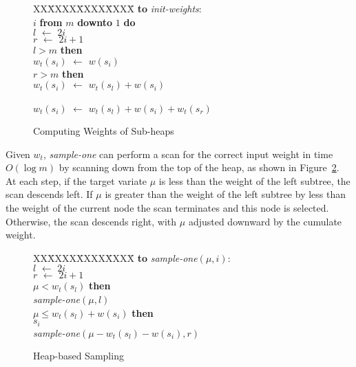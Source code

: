 \documentclass[12pt]{article}
\newcommand{\asgn}{\,\,\leftarrow\,\,}
\begin{document}
  \begin{figure}
    \centering
    \begin{minipage}{0.6\textwidth}
      \begin{tabbing}
      XX\=XXXX\=XXXX\=XXXX\=\kill
      {\bf to} {\it init-weights}: \\
       $i$ {\bf from} $m$ {\bf downto} $1$ {\bf do} \\
      \>\>$l \asgn 2i$ \\
      \>\>$r \asgn 2i + 1$ \\
      \> $l > m$ {\bf then} \\
      \>\>\>$w_t(s_i) \asgn w(s_i)$ \\
      \> $r > m$ {\bf then} \\
      \>\>\>$w_t(s_i) \asgn w_t(s_l) + w(s_i)$ \\
      \>\\
      \>\>\>$w_t(s_i) \asgn w_t(s_l) + w(s_i) + w_t(s_r)$
    \end{tabbing}
    \end{minipage}
    \caption{Computing Weights of Sub-heaps}\label{fig-heap}
  \end{figure}

  Given $w_t$, {\em sample-one} can perform a scan for the
  correct input weight in time $O(\log m)$ by scanning down
  from the top of the heap, as shown in
  Figure~\ref{fig-onlm}.  At each step, if the target
  variate $\mu$ is less than the weight of the left subtree,
  the scan descends left.  If $\mu$ is greater than the
  weight of the left subtree by less than the weight of the
  current node the scan terminates and this node is
  selected.  Otherwise, the scan descends right, with
  $\mu$ adjusted downward by the cumulate weight.

  \begin{figure}
    \centering
    \begin{minipage}{0.6\textwidth}
      \begin{tabbing}
      XX\=XXXX\=XXXX\=XXXX\=\kill
      {\bf to} {\it sample-one}$(\mu,i)$: \\
      \>$l \asgn 2i$ \\
      \>$r \asgn 2i + 1$ \\
       $\mu < w_t(s_l)$ {\bf then} \\
      \> {\it sample-one}$(\mu, l)$ \\
       $\mu \le w_t(s_l) + w(s_i)$ {\bf then} \\
      \> $s_i$ \\
       {\it sample-one}$(\mu - w_t(s_l) - w(s_i), r)$
    \end{tabbing}
    \end{minipage}
    \caption{Heap-based Sampling}\label{fig-onlm}
  \end{figure}
\end{document}
